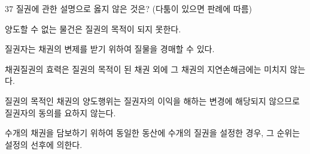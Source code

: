 \begin{question}{37}
질권에 관한 설명으로 옳지 않은 것은? (다툼이 있으면 판례에 따름)
\begin{choices}
  \item 양도할 수 없는 물건은 질권의 목적이 되지 못한다.
  \item 질권자는 채권의 변제를 받기 위하여 질물을 경매할 수 있다.
  \item 채권질권의 효력은 질권의 목적이 된 채권 외에 그 채권의 지연손해금에는 미치지 않는다.
  \item 질권의 목적인 채권의 양도행위는 질권자의 이익을 해하는 변경에 해당되지 않으므로 질권자의 동의를 요하지 않는다.
  \item 수개의 채권을 담보하기 위하여 동일한 동산에 수개의 질권을 설정한 경우, 그 순위는 설정의 선후에 의한다.
\end{choices}
\end{question}
